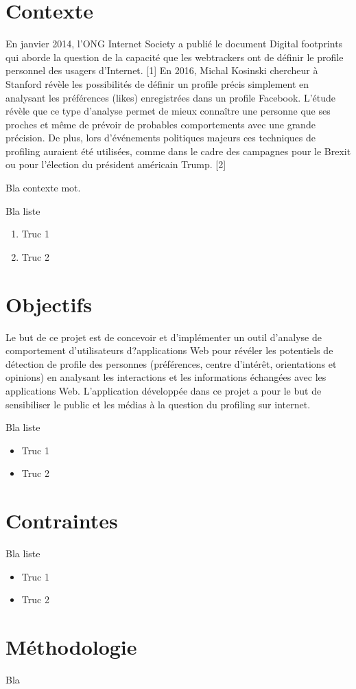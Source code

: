 \section{Contexte}

	En janvier 2014, l'ONG Internet Society a publié le document Digital footprints qui aborde la question de la capacité que les webtrackers ont de définir le profile personnel des usagers d'Internet. [1]
	En 2016, Michal Kosinski chercheur à Stanford révèle les possibilités de définir un profile précis simplement en analysant les préférences (likes) enregistrées dans un profile Facebook. L'étude révèle que ce type d'analyse permet de mieux connaître une personne que ses proches et même de prévoir de probables comportements avec une grande précision. De plus, lors d'événements politiques majeurs ces techniques de profiling auraient été utilisées, comme dans le cadre des campagnes pour le Brexit ou pour l'élection du président américain Trump. [2]

	Bla contexte \gls{mot}.

	Bla liste
	\begin{enumerate}
		\item Truc 1
		\item Truc 2
	\end{enumerate}

\section{Objectifs}

	Le but de ce projet est de concevoir et d'implémenter un outil d'analyse de comportement d'utilisateurs d?applications Web pour révéler les potentiels de détection de profile des personnes (préférences, centre d'intérêt, orientations et opinions) en analysant les interactions et les informations échangées avec les applications Web. L'application développée dans ce projet a pour le but de sensibiliser le public et les médias à la question du profiling sur internet.

	Bla liste
	\begin{itemize}
		\item Truc 1
		\item Truc 2
	\end{itemize}

\section{Contraintes}

	Bla liste
	\begin{itemize}
		\item Truc 1
		\item Truc 2
	\end{itemize}

\section{Méthodologie}

	Bla